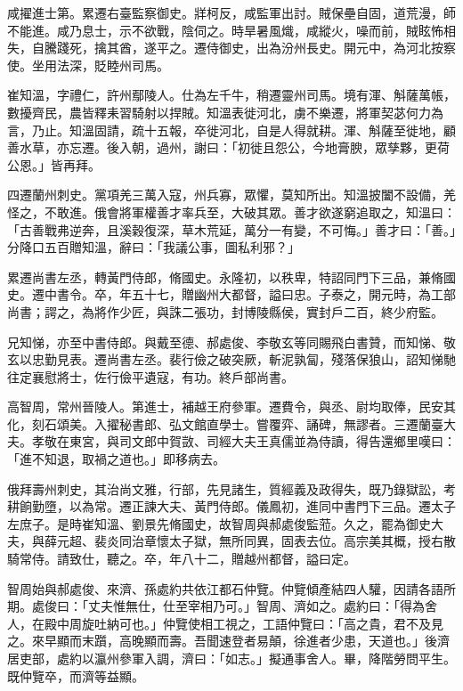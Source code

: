 \begin{pinyinscope}
 咸擢進士第。累遷右臺監察御史。牂柯反，咸監軍出討。賊保壘自固，道荒漫，師不能進。咸乃息士，示不欲戰，陰伺之。時旱暑風熾，咸縱火，噪而前，賊眩怖相失，自騰踐死，擒其酋，遂平之。遷侍御史，出為汾州長史。開元中，為河北按察使。坐用法深，貶睦州司馬。



 崔知溫，字禮仁，許州鄢陵人。仕為左千牛，稍遷靈州司馬。境有渾、斛薩萬帳，數擾齊民，農皆釋耒習騎射以捍賊。知溫表徙河北，虜不樂遷，將軍契苾何力為言，乃止。知溫固請，疏十五報，卒徙河北，自是人得就耕。渾、斛薩至徙地，顧善水草，亦忘遷。後入朝，過州，謝曰：「初徙且怨公，今地膏腴，眾孳夥，更荷公恩。」皆再拜。



 四遷蘭州刺史。黨項羌三萬入寇，州兵寡，眾懼，莫知所出。知溫披闔不設備，羌怪之，不敢進。俄會將軍權善才率兵至，大破其眾。善才欲遂窮追取之，知溫曰：「古善戰弗逆奔，且溪穀復深，草木荒延，萬分一有變，不可悔。」善才曰：「善。」分降口五百贈知溫，辭曰：「我議公事，圖私利邪？」



 累遷尚書左丞，轉黃門侍郎，脩國史。永隆初，以秩卑，特詔同門下三品，兼脩國史。遷中書令。卒，年五十七，贈幽州大都督，謚曰忠。子泰之，開元時，為工部尚書；諤之，為將作少匠，與誅二張功，封博陵縣侯，實封戶二百，終少府監。



 兄知悌，亦至中書侍郎。與戴至德、郝處俊、李敬玄等同賜飛白書贊，而知悌、敬玄以忠勤見表。遷尚書左丞。裴行儉之破突厥，斬泥孰匐，殘落保狼山，詔知悌馳往定襄慰將士，佐行儉平遺寇，有功。終戶部尚書。



 高智周，常州晉陵人。第進士，補越王府參軍。遷費令，與丞、尉均取俸，民安其化，刻石頌美。入擢秘書郎、弘文館直學士。嘗覆弈、誦碑，無謬者。三遷蘭臺大夫。孝敬在東宮，與司文郎中賀敳、司經大夫王真儒並為侍讀，得告還鄉里嘆曰：「進不知退，取禍之道也。」即移病去。



 俄拜壽州刺史，其治尚文雅，行部，先見諸生，質經義及政得失，既乃錄獄訟，考耕餉勤墮，以為常。遷正諫大夫、黃門侍郎。儀鳳初，進同中書門下三品。遷太子左庶子。是時崔知溫、劉景先脩國史，故智周與郝處俊監蒞。久之，罷為御史大夫，與薛元超、裴炎同治章懷太子獄，無所同異，固表去位。高宗美其概，授右散騎常侍。請致仕，聽之。卒，年八十二，贈越州都督，謚曰定。



 智周始與郝處俊、來濟、孫處約共依江都石仲覽。仲覽傾產結四人驩，因請各語所期。處俊曰：「丈夫惟無仕，仕至宰相乃可。」智周、濟如之。處約曰：「得為舍人，在殿中周旋吐納可也。」仲覽使相工視之，工語仲覽曰：「高之貴，君不及見之。來早顯而末躓，高晚顯而壽。吾聞速登者易顛，徐進者少患，天道也。」後濟居吏部，處約以瀛州參軍入調，濟曰：「如志。」擬通事舍人。畢，降階勞問平生。既仲覽卒，而濟等益顯。




\end{pinyinscope}
